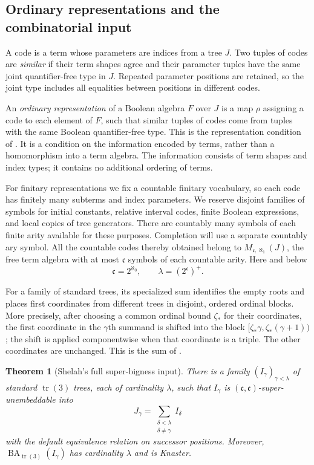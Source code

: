 \documentclass[11pt]{article}
\newtheorem{theorem}{Theorem}[section]
\theoremstyle{definition}
\theoremstyle{remark}
\newcommand{\BA}{\operatorname{BA}_{\operatorname{tr}(3)}}
\newcommand{\cc}{\mathfrak c}
\newcommand{\tr}{\operatorname{tr}}
\begin{document}
\subsection{Ordinary representations and the combinatorial input}

A code is a term whose parameters are indices from a tree $J$.  Two tuples
of codes are \emph{similar} if their term shapes agree and their parameter
tuples have the same joint quantifier-free type in $J$.  Repeated parameter
positions are retained, so the joint type includes all equalities between
positions in different codes.

An \emph{ordinary representation} of a Boolean algebra $F$ over $J$ is a
map $\rho$ assigning a code to each element of $F$, such that similar tuples
of codes come from tuples with the same Boolean quantifier-free type.  This
is the representation condition of \cite[Definition~2.1(c),(e),(g)]{ShelahE59}.
It is a condition on the information encoded by terms, rather than a
homomorphism into a term algebra.  The information consists of term shapes
and index types; it contains no additional ordering of terms.

For finitary representations we fix a countable finitary vocabulary, so
each code has finitely many subterms and index parameters.  We reserve
disjoint families of symbols for initial constants, relative interval
codes, finite Boolean expressions, and local copies of tree generators.
There are countably many symbols of each finite arity available for these
purposes.  Completion will use a separate countably ary symbol.  All the
countable codes thereby obtained belong to
$M_{\cc,\aleph_1}(J)$, the free term algebra with at most $\cc$ symbols of
each countable arity.  Here and below
\[
 \cc=2^{\aleph_0},\qquad \lambda=(2^\cc)^+.
\]

For a family of standard trees, its specialized sum identifies the empty
roots and places first coordinates from different trees in disjoint,
ordered ordinal blocks.  More precisely, after choosing a common ordinal
bound $\zeta_*$ for their coordinates, the first coordinate in the
$\gamma$th summand is shifted into the block
$[\zeta_*\gamma,\zeta_*(\gamma+1))$; the shift is applied componentwise
when that coordinate is a triple.  The other coordinates are unchanged.
This is the sum of \cite[Definition~1.4(4)]{Shelah2023}.

\begin{theorem}[Shelah's full super-bigness input]\label{thm:tree-input}
There is a family $(I_\gamma)_{\gamma<\lambda}$ of standard
$\tr(3)$ trees, each of cardinality $\lambda$, such that
$I_\gamma$ is $(\cc,\cc)$-super-unembeddable into
\[
  J_\gamma=\sum_{\substack{\delta<\lambda\\\delta\ne\gamma}}I_\delta
\]
with the default equivalence relation on successor positions.  Moreover,
$\BA(I_\gamma)$ has cardinality $\lambda$ and is Knaster.
\end{theorem}
\end{document}
